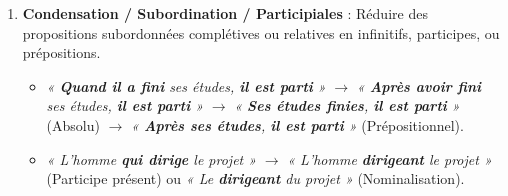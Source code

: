 \documentclass[11pt]{article}
\begin{document}
\begin{propriete}
\begin{enumerate}
\begin{itemize}
    \end{itemize}
\item \textbf{Condensation / Subordination / Participiales} : Réduire des propositions subordonnées complétives ou relatives en infinitifs, participes, ou prépositions.
    \begin{itemize}
    \item \textit{« \textbf{Quand il a fini} ses études, \textbf{il est parti} »} $\rightarrow$ \textit{« \textbf{Après avoir fini} ses études, \textbf{il est parti} »} $\rightarrow$ \textit{« \textbf{Ses études finies}, \textbf{il est parti} »} (Absolu) $\rightarrow$ \textit{« \textbf{Après ses études}, \textbf{il est parti} »} (Prépositionnel).
    \item \textit{« L'homme \textbf{qui dirige} le projet »} $\rightarrow$ \textit{« L'homme \textbf{dirigeant} le projet »} (Participe présent) ou \textit{« Le \textbf{dirigeant} du projet »} (Nominalisation).
    \end{itemize}
\end{enumerate}
\end{propriete}
\end{document}
